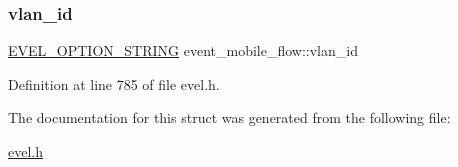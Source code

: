 \subsubsection{\texorpdfstring{vlan\+\_\+id}{vlan\_id}}
{\footnotesize\ttfamily \hyperlink{evel_8h_a0de5113a7b72de93c0c7b644f7ea7ec3}{E\+V\+E\+L\+\_\+\+O\+P\+T\+I\+O\+N\+\_\+\+S\+T\+R\+I\+NG} event\+\_\+mobile\+\_\+flow\+::vlan\+\_\+id}



Definition at line 785 of file evel.\+h.



The documentation for this struct was generated from the following file\+:\begin{DoxyCompactItemize}
\item 
\hyperlink{evel_8h}{evel.\+h}\end{DoxyCompactItemize}
